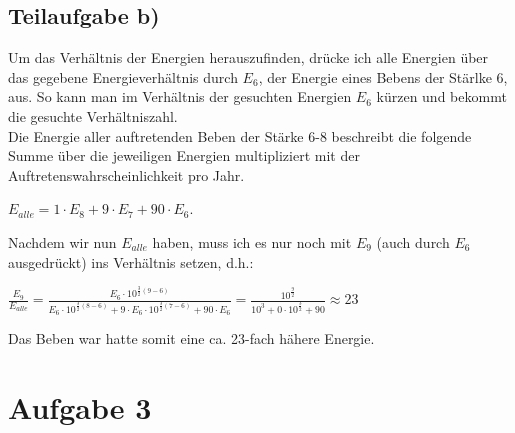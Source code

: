 \documentclass{article}
\begin{document}
\subsection*{Teilaufgabe b)}
Um das Verhältnis der Energien herauszufinden, drücke ich alle Energien über das gegebene Energieverhältnis durch $E_6$, der Energie eines Bebens der Stärlke 6, aus. 
So kann man im Verhältnis der gesuchten Energien $E_6$ kürzen und bekommt die gesuchte Verhältniszahl.\\
Die Energie aller auftretenden Beben der Stärke 6-8 beschreibt die folgende Summe über die jeweiligen Energien multipliziert mit der Auftretenswahrscheinlichkeit pro Jahr. 
\begin{center}
$E_{alle} = 1 \cdot E_8 + 9 \cdot E_7 + 90 \cdot E_6$. 
\end{center}
Nachdem wir nun $E_{alle}$ haben, muss ich es nur noch mit $E_9$ (auch durch $E_6$ ausgedrückt) ins Verhältnis setzen, d.h.:
\begin{center}
$\frac{E_9}{E_{alle}} = \frac{E_6 \cdot 10^{\frac{3}{2} (9 - 6)}}{E_6 \cdot 10^{\frac{3}{2}(8-6)} + 9 \cdot E_6 \cdot 10^{\frac{3}{2}(7-6)} + 90 \cdot E_6}
= \frac{10^\frac{9}{2}}{10^3 + 0 \cdot 10^\frac{3}{2} + 90} \approx 23$
\end{center}
Das Beben war hatte somit eine ca. 23-fach hähere Energie. 
\section*{Aufgabe 3}
\end{document}
